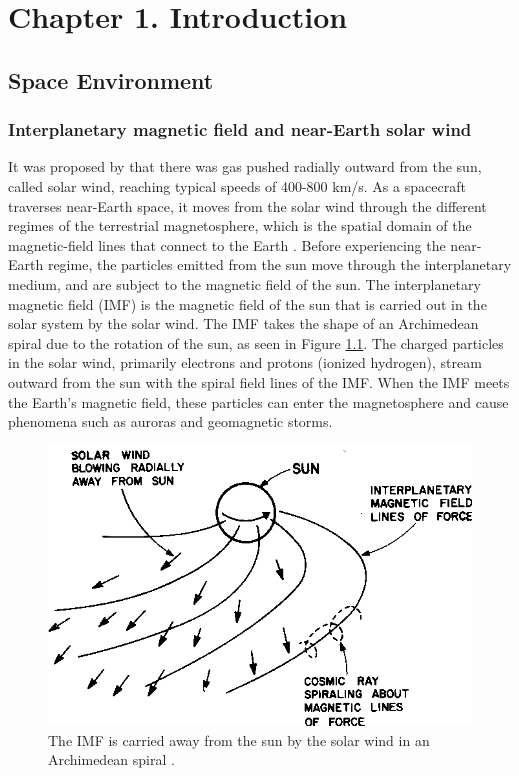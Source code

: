 \chapter{Chapter 1. Introduction}

\section{Space Environment}

\subsection{Interplanetary magnetic field and near-Earth solar wind}
It was proposed by \cite{Parker:1958} that there was gas pushed radially outward from the sun, called solar wind, reaching typical speeds of 400-800 km/s. As a spacecraft traverses near-Earth space, it moves from the solar wind through the different regimes of the terrestrial magnetosphere, which is the spatial domain of the magnetic-field lines that connect to the Earth \citep{Borovsky:2018}. Before experiencing the near-Earth regime, the particles emitted from the sun move through the interplanetary medium, and are subject to the magnetic field of the sun. The interplanetary magnetic field (\gls{IMF}) is the magnetic field of the sun that is carried out in the solar system by the solar wind. The IMF takes the shape of an Archimedean spiral due to the rotation of the sun, as seen in Figure \ref{fig:IMF-spiral}. The charged particles in the solar wind, primarily electrons and protons (ionized hydrogen), stream outward from the sun with the spiral field lines of the IMF. When the IMF meets the Earth's magnetic field, these particles can enter the magnetosphere and cause phenomena such as auroras and geomagnetic storms.

\begin{figure}
    \centering
    \includegraphics[width=\linewidth]{Figures/IMF.png}
    \caption[Diagram of the interplanetary magnetic field]{The IMF is carried away from the sun by the solar wind in an Archimedean spiral \citep{Mccracken:1967}.}
    \label{fig:IMF-spiral}
\end{figure}



